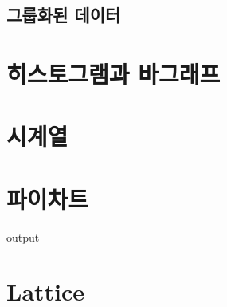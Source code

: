\subsection{그룹화된 데이터}


\section{히스토그램과 바그래프}


\section{시계열}


\section{파이차트}




\begin{Schunk}
\begin{Soutput}
output
\end{Soutput}
\end{Schunk}










\section{Lattice}

